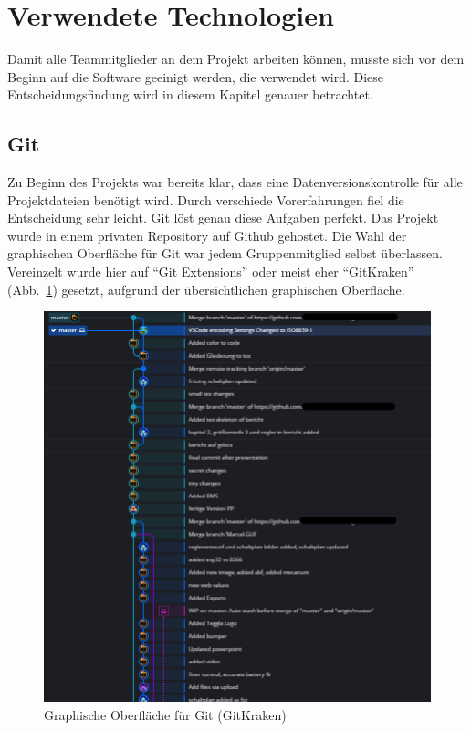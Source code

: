 \section{Verwendete Technologien}
Damit alle Teammitglieder an dem Projekt arbeiten können, musste sich vor dem Beginn auf die Software geeinigt werden, die verwendet wird. 
Diese Entscheidungsfindung wird in diesem Kapitel genauer betrachtet.

\subsection{Git}
Zu Beginn des Projekts war bereits klar, dass eine Datenversionskontrolle für alle Projektdateien benötigt wird.
Durch verschiede Vorerfahrungen fiel die Entscheidung sehr leicht. Git löst genau diese Aufgaben perfekt. Das Projekt wurde in einem privaten Repository auf Github gehostet. 
Die Wahl der graphischen Oberfläche für Git war jedem Gruppenmitglied selbst überlassen.
Vereinzelt wurde hier auf ``Git Extensions'' oder meist eher ``GitKraken'' (Abb.~\ref{bild:gitkraken}) gesetzt, aufgrund der übersichtlichen graphischen Oberfläche.

\begin{figure}[!ht]
	\centering
	\includegraphics[width=.7\textwidth]{bilder/GitKrakenUebersicht.png}
	\caption{Graphische Oberfläche für Git (GitKraken)}
	\label{bild:gitkraken}
\end{figure}



